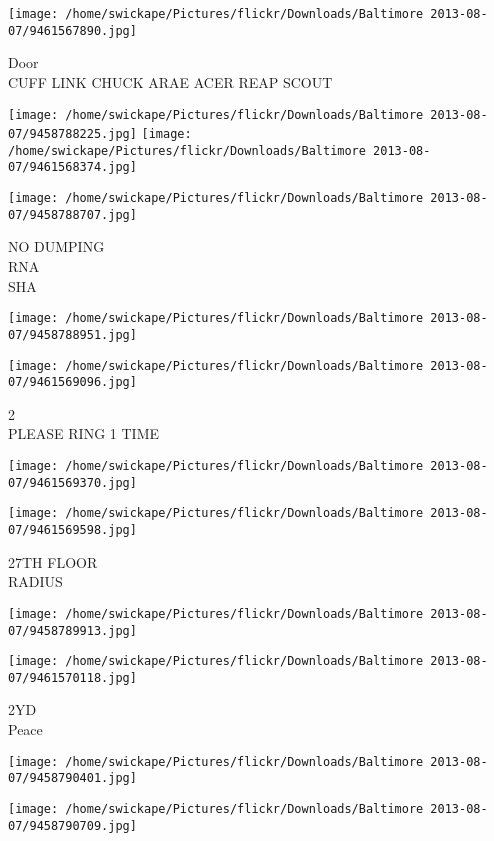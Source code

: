 \documentclass[10pt,letterpaper]{article}
\begin{document}
\vspace{0.25in}
\texttt{[image: /home/swickape/Pictures/flickr/Downloads/Baltimore 2013-08-07/9461567890.jpg]}

Door\\
CUFF LINK CHUCK ARAE ACER REAP SCOUT
\pagebreak

\texttt{[image: /home/swickape/Pictures/flickr/Downloads/Baltimore 2013-08-07/9458788225.jpg]}
\texttt{[image: /home/swickape/Pictures/flickr/Downloads/Baltimore 2013-08-07/9461568374.jpg]}

\texttt{[image: /home/swickape/Pictures/flickr/Downloads/Baltimore 2013-08-07/9458788707.jpg]}

NO DUMPING\\
RNA\\
SHA
\pagebreak

\texttt{[image: /home/swickape/Pictures/flickr/Downloads/Baltimore 2013-08-07/9458788951.jpg]}

\vspace{0.25in}
\texttt{[image: /home/swickape/Pictures/flickr/Downloads/Baltimore 2013-08-07/9461569096.jpg]}

2\\
PLEASE RING 1 TIME
\pagebreak

\texttt{[image: /home/swickape/Pictures/flickr/Downloads/Baltimore 2013-08-07/9461569370.jpg]}

\vspace{0.25in}
\texttt{[image: /home/swickape/Pictures/flickr/Downloads/Baltimore 2013-08-07/9461569598.jpg]}

27TH FLOOR\\
RADIUS
\pagebreak

\texttt{[image: /home/swickape/Pictures/flickr/Downloads/Baltimore 2013-08-07/9458789913.jpg]}

\vspace{0.25in}
\texttt{[image: /home/swickape/Pictures/flickr/Downloads/Baltimore 2013-08-07/9461570118.jpg]}

2YD\\
Peace
\pagebreak

\texttt{[image: /home/swickape/Pictures/flickr/Downloads/Baltimore 2013-08-07/9458790401.jpg]}

\vspace{0.25in}
\texttt{[image: /home/swickape/Pictures/flickr/Downloads/Baltimore 2013-08-07/9458790709.jpg]}
\end{document}

